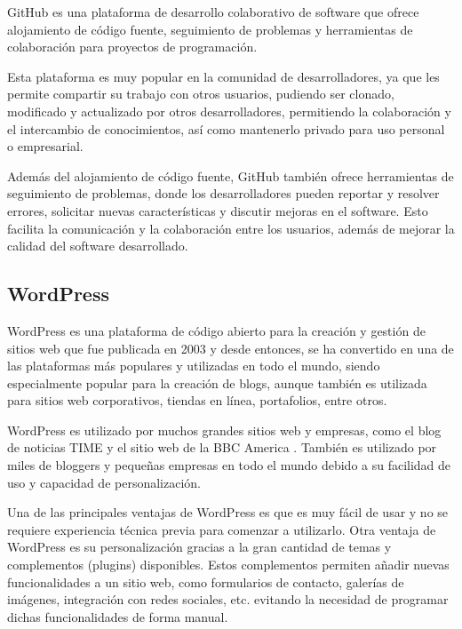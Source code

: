             GitHub es una plataforma de desarrollo colaborativo de software que ofrece alojamiento de código fuente, seguimiento de problemas y herramientas de colaboración para proyectos de programación.
            
            Esta plataforma es muy popular en la comunidad de desarrolladores, ya que les permite compartir su trabajo con otros usuarios, pudiendo ser clonado, modificado y actualizado por otros desarrolladores, permitiendo la colaboración y el intercambio de conocimientos, así como mantenerlo privado para uso personal o empresarial.
            
            Además del alojamiento de código fuente, GitHub también ofrece herramientas de seguimiento de problemas, donde los desarrolladores pueden reportar y resolver errores, solicitar nuevas características y discutir mejoras en el software. Esto facilita la comunicación y la colaboración entre los usuarios, además de mejorar la calidad del software desarrollado.
            
        \subsection{WordPress}
            
            WordPress \cite{wordpress} es una plataforma de código abierto para la creación y gestión de sitios web que fue publicada en 2003 y desde entonces, se ha convertido en una de las plataformas más populares y utilizadas en todo el mundo, siendo especialmente popular para la creación de blogs, aunque también es utilizada para sitios web corporativos, tiendas en línea, portafolios, entre otros. 
            
            WordPress es utilizado por muchos grandes sitios web y empresas, como el blog de noticias TIME \cite{time-web} y el sitio web de la BBC America \cite{bbc-america-web}. También es utilizado por miles de bloggers y pequeñas empresas en todo el mundo debido a su facilidad de uso y capacidad de personalización.

            Una de las principales ventajas de WordPress es que es muy fácil de usar y no se requiere experiencia técnica previa para comenzar a utilizarlo. Otra ventaja de WordPress es su personalización gracias a la gran cantidad de temas y complementos (plugins) disponibles. Estos complementos permiten añadir nuevas funcionalidades a un sitio web, como formularios de contacto, galerías de imágenes, integración con redes sociales, etc. evitando la necesidad de programar dichas funcionalidades de forma manual.
            
